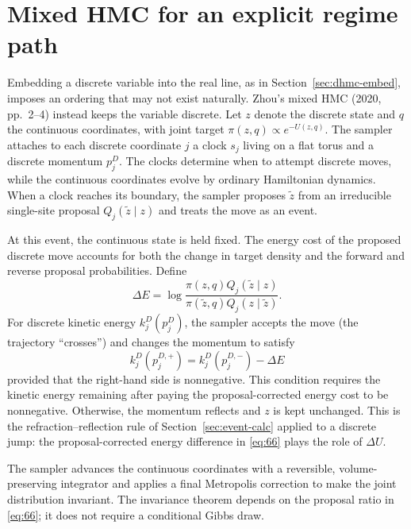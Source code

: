\documentclass[11pt]{article}
\begin{document}
\section{Mixed HMC for an explicit regime path}\label{sec:mixed}

Embedding a discrete variable into the real line, as in Section~\ref{sec:dhmc-embed}, imposes an ordering that may not exist naturally. Zhou's mixed HMC (2020, pp.~2--4) instead keeps the variable discrete. Let $z$ denote the discrete state and $q$ the continuous coordinates, with joint target $\pi(z,q)\propto e^{-U(z,q)}$. The sampler attaches to each discrete coordinate $j$ a clock $s_j$ living on a flat torus and a discrete momentum $p_j^D$. The clocks determine when to attempt discrete moves, while the continuous coordinates evolve by ordinary Hamiltonian dynamics. When a clock reaches its boundary, the sampler proposes $\widetilde z$ from an irreducible single-site proposal $Q_j(\widetilde z\mid z)$ and treats the move as an event.

At this event, the continuous state is held fixed. The energy cost of the proposed discrete move accounts for both the change in target density and the forward and reverse proposal probabilities. Define
\begin{equation}\label{eq:66}
 \Delta E=\log\frac{\pi(z,q)Q_j(\widetilde z\mid z)}
                         {\pi(\widetilde z,q)Q_j(z\mid\widetilde z)}.
\end{equation}
For discrete kinetic energy $k_j^D(p_j^D)$, the sampler accepts the move (the trajectory ``crosses'') and changes the momentum to satisfy
\begin{equation}\label{eq:67}
 k_j^D(p_j^{D,+})=k_j^D(p_j^{D,-})-\Delta E
\end{equation}
provided that the right-hand side is nonnegative. This condition requires the kinetic energy remaining after paying the proposal-corrected energy cost to be nonnegative. Otherwise, the momentum reflects and $z$ is kept unchanged. This is the refraction--reflection rule of Section~\ref{sec:event-calc} applied to a discrete jump: the proposal-corrected energy difference in \eqref{eq:66} plays the role of $\Delta U$.

The sampler advances the continuous coordinates with a reversible, volume-preserving integrator and applies a final Metropolis correction to make the joint distribution invariant. The invariance theorem depends on the proposal ratio in \eqref{eq:66}; it does not require a conditional Gibbs draw.
\end{document}
